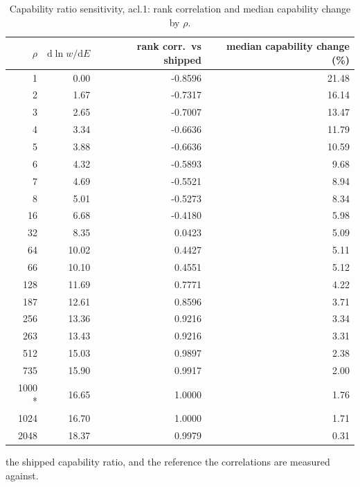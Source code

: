 \begin{table}[htbp]
  \centering
  \caption{Capability ratio sensitivity, acl.1: rank correlation and median capability change by $\rho$.}
  \label{tab:rho-acl-1-summary}
  \begin{tabular}{r r r r}
    \toprule
    $\rho$ & $\mathrm{d}\ln w/\mathrm{d}E$ & rank corr.\ vs shipped & median capability change (\%) \\
    \midrule
    1 & 0.00 & -0.8596 & 21.48 \\
    2 & 1.67 & -0.7317 & 16.14 \\
    3 & 2.65 & -0.7007 & 13.47 \\
    4 & 3.34 & -0.6636 & 11.79 \\
    5 & 3.88 & -0.6636 & 10.59 \\
    6 & 4.32 & -0.5893 & 9.68 \\
    7 & 4.69 & -0.5521 & 8.94 \\
    8 & 5.01 & -0.5273 & 8.34 \\
    16 & 6.68 & -0.4180 & 5.98 \\
    32 & 8.35 & 0.0423 & 5.09 \\
    64 & 10.02 & 0.4427 & 5.11 \\
    66 & 10.10 & 0.4551 & 5.12 \\
    128 & 11.69 & 0.7771 & 4.22 \\
    187 & 12.61 & 0.8596 & 3.71 \\
    256 & 13.36 & 0.9216 & 3.34 \\
    263 & 13.43 & 0.9216 & 3.31 \\
    512 & 15.03 & 0.9897 & 2.38 \\
    735 & 15.90 & 0.9917 & 2.00 \\
    1000 * & 16.65 & 1.0000 & 1.76 \\
    1024 & 16.70 & 1.0000 & 1.71 \\
    2048 & 18.37 & 0.9979 & 0.31 \\
    \bottomrule
  \end{tabular}
  \par\smallskip\footnotesize * the shipped capability ratio, and the reference the correlations are measured against.
\end{table}
